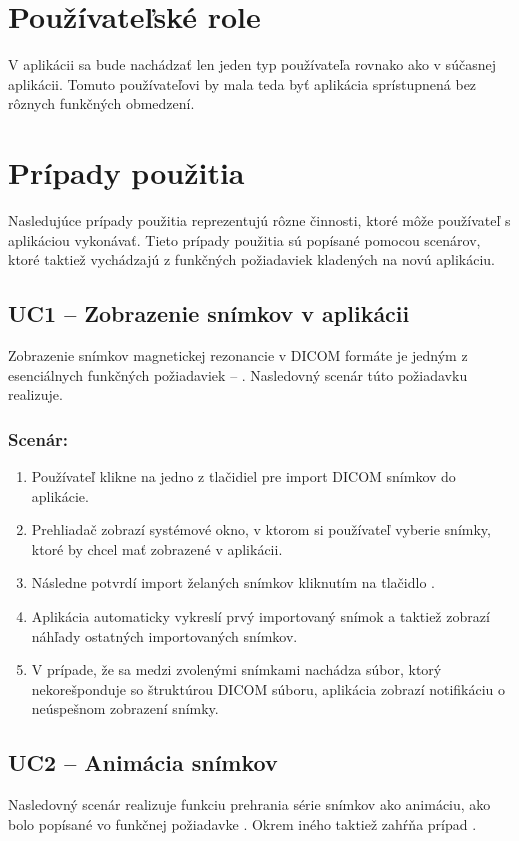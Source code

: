 {\section {Používateľské role}

V aplikácii sa bude nachádzať len jeden typ používateľa rovnako ako v súčasnej aplikácii. Tomuto používateľovi by mala teda byť aplikácia sprístupnená bez rôznych funkčných obmedzení.

\section {Prípady použitia}
Nasledujúce prípady použitia reprezentujú rôzne činnosti, ktoré môže používateľ s aplikáciou vykonávať. Tieto prípady použitia sú popísané pomocou scenárov, ktoré taktiež vychádzajú z funkčných požiadaviek kladených na novú aplikáciu.

\subsection {UC1 -- Zobrazenie snímkov v aplikácii}\label{uc1}
Zobrazenie snímkov magnetickej rezonancie v DICOM formáte je jedným z esenciálnych funkčných požiadaviek -- . Nasledovný scenár túto požiadavku realizuje.

\subsubsection*{Scenár:}
\begin {enumerate}
\item {Používateľ klikne na jedno z tlačidiel pre import DICOM snímkov do aplikácie.}
\item {Prehliadač zobrazí systémové okno, v ktorom si používateľ vyberie snímky, ktoré by chcel mať zobrazené v aplikácii.}
\item {Následne potvrdí import želaných snímkov kliknutím na tlačidlo .}
\item {Aplikácia automaticky vykreslí prvý importovaný snímok a taktiež zobrazí náhľady ostatných importovaných snímkov.}
\item {V prípade, že sa medzi zvolenými snímkami nachádza súbor, ktorý nekorešponduje so štruktúrou DICOM súboru, aplikácia zobrazí notifikáciu o neúspešnom zobrazení snímky.}
\end {enumerate}
	
\subsection {UC2 -- Animácia snímkov}
Nasledovný scenár realizuje funkciu prehrania série snímkov ako animáciu, ako bolo popísané vo funkčnej požiadavke .
Okrem iného taktiež zahŕňa prípad . 

}
